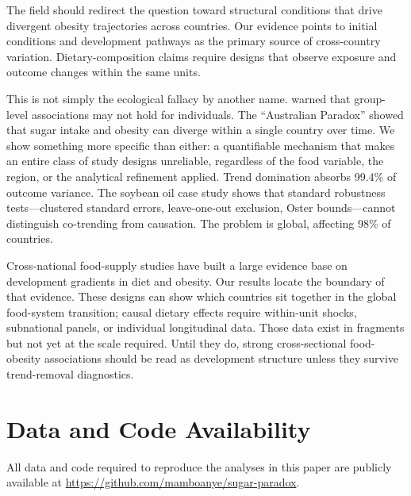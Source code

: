 \documentclass[letterpaper,11pt,leqno]{article}
\begin{document}
The field should redirect the question toward structural conditions that drive divergent obesity trajectories across countries. Our evidence points to initial conditions and development pathways as the primary source of cross-country variation. Dietary-composition claims require designs that observe exposure and outcome changes within the same units.

This is not simply the ecological fallacy by another name. \citet{robinson1950} warned that group-level associations may not hold for individuals. The ``Australian Paradox'' \citep{barclay2011} showed that sugar intake and obesity can diverge within a single country over time. We show something more specific than either: a quantifiable mechanism that makes an entire class of study designs unreliable, regardless of the food variable, the region, or the analytical refinement applied. Trend domination absorbs 99.4\% of outcome variance. The soybean oil case study shows that standard robustness tests---clustered standard errors, leave-one-out exclusion, Oster bounds---cannot distinguish co-trending from causation. The problem is global, affecting 98\% of countries.

Cross-national food-supply studies have built a large evidence base on development gradients in diet and obesity. Our results locate the boundary of that evidence. These designs can show which countries sit together in the global food-system transition; causal dietary effects require within-unit shocks, subnational panels, or individual longitudinal data. Those data exist in fragments but not yet at the scale required. Until they do, strong cross-sectional food-obesity associations should be read as development structure unless they survive trend-removal diagnostics.

\section*{Data and Code Availability}

All data and code required to reproduce the analyses in this paper are publicly available at \url{https://github.com/mamboanye/sugar-paradox}.


\end{document}

